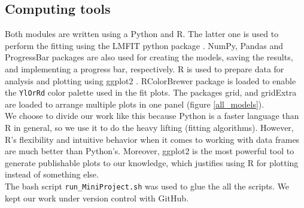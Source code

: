 \documentclass[titlepage,11pt]{article}
\begin{document}
\begin{linenumbers}
	\subsection{Computing tools}
	Both modules are written using a Python and R. The latter one is used to perform the fitting using the LMFIT python package \cite{Newville2014}. NumPy, Pandas \cite{Virtanen2020} and ProgressBar packages are also used for creating the models, saving the results, and implementing a progress bar, respectively. R is used to prepare data for analysis and plotting using ggplot2 \cite{Wickham2016}. RColorBrewer package is loaded to enable the \verb|YlOrRd| color palette used in the fit plots. The packages grid, and gridExtra are loaded to arrange multiple plots in one panel (figure \ref{all_models}).\\
	We choose to divide our work like this because Python is a faster language than R in general, so we use it to do the heavy lifting (fitting algorithms). However, R's flexibility and intuitive behavior when it comes to working with data frames are much better than Python's. Moreover, ggplot2 is the most powerful tool to generate publishable plots to our knowledge, which justifies using R for plotting instead of something else.\\
	The bash script \verb|run_MiniProject.sh| was used to glue the all the scripts. We kept our work under version control with GitHub.
	

\end{linenumbers}
\end{document}
